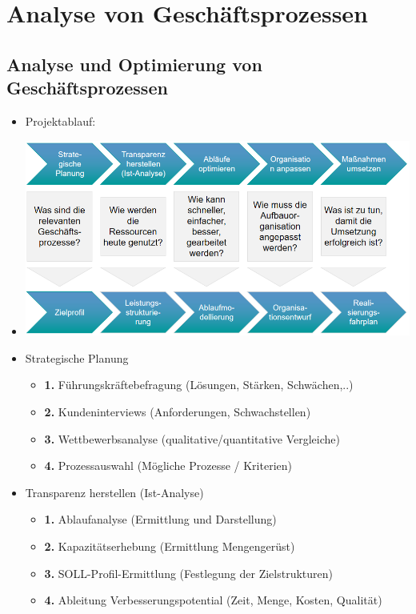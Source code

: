 \documentclass[11pt,a4paper]{article}
\begin{document}
\section{Analyse von Geschäftsprozessen}
\subsection{Analyse und Optimierung von Geschäftsprozessen}
\begin{itemize}
\item Projektablauf:
\item[] \includegraphics[width=15cm]{Bilder/projektablauf}


\item Strategische Planung
	\begin{itemize}
	\item \textbf{1.} Führungskräftebefragung (Lösungen, Stärken, Schwächen,..)
	\item \textbf{2.} Kundeninterviews (Anforderungen, Schwachstellen)
	\item \textbf{3.} Wettbewerbsanalyse (qualitative/quantitative Vergleiche)
	\item \textbf{4.} Prozessauswahl (Mögliche Prozesse / Kriterien)
	\end{itemize}
	
\item Transparenz herstellen (Ist-Analyse)
	\begin{itemize}
	\item \textbf{1.} Ablaufanalyse (Ermittlung und Darstellung)
	\item \textbf{2.} Kapazitätserhebung (Ermittlung Mengengerüst)
	\item \textbf{3.} SOLL-Profil-Ermittlung (Festlegung der Zielstrukturen) 
	\item \textbf{4.} Ableitung Verbesserungspotential (Zeit, Menge, Kosten, Qualität)
	\end{itemize}
	

\end{itemize}
\end{document}
